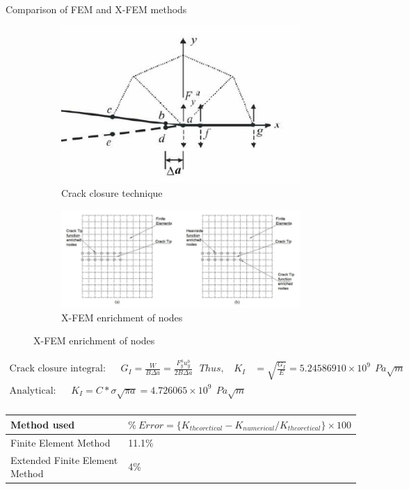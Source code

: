 \documentclass{beamer}
\begin{document}
\begin{frame}[t,fragile]{Comparison of FEM and X-FEM methods}
    \vspace{-.7cm}
    \hspace{15pt}
    \begin{figure}[H]
      \begin{subfigure}{0.45\textwidth}
    \centering
    \includegraphics[scale=.2]{crackclosure.png}
    \caption{\tiny Crack closure technique}
\end{subfigure}
        \hspace{15pt}
      \begin{subfigure}{0.45\textwidth}
    \centering
    \includegraphics[scale=.15]{k.png}
    \caption{\tiny X-FEM enrichment of nodes}
\end{subfigure}
\end{figure}
\vspace{-12pt}
    \tiny
\begin{align*}
    \text{Crack closure integral:}\ \ \ \ \ \ \ G_I=\frac{W}{B\Delta a}=\frac{F_{y}^au_{y}^b}{2B \Delta a}\ \ \ Thus, \ \ \ \
    K_I&=\sqrt{\frac{G_I}{E}}=5.24586910\times 10^9\ \ Pa\sqrt{m}\\ 
    \text{Analytical:}\ \ \ \ \ \ \ K_I=C*\sigma\sqrt{\pi a}=4.726065 \times 10^9\ \ Pa\sqrt{m}\\
\end{align*}
\vspace{-28pt}
\bgroup
\def\arraystretch{2}
\begin{table}[H]
    \centering
    \begin{tabular}{|C{3cm}|C{6cm}|}
\hline
Method used& $\% \ Error= \{K_{theoretical}-K_{numerical}/K_{theoretical}\}\times 100$\\
\hline
 Finite Element Method & 11.1\%\\
\hline
 Extended Finite Element Method& 4\%\\
\hline
\end{tabular}
\label{table1}
\end{table}
\egroup
\end{frame} 
\end{document}
